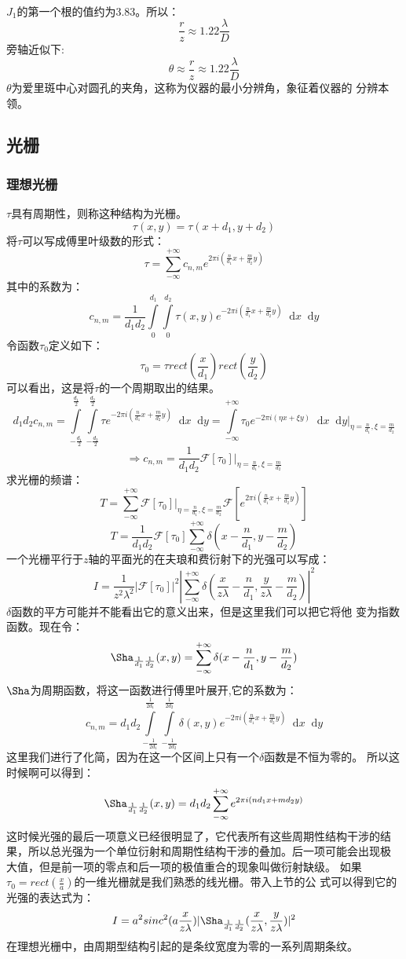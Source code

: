\documentclass{article}
\newcommand*{\dif}{\mathop{}\!\mathrm{d}}
\begin{document}
\paragraph{}
$J_1$的第一个根的值约为3.83。所以：
\[\frac{r}{z}\approx 1.22 \frac{\lambda}{D}\]
旁轴近似下:
\[\theta\approx \frac{r}{z}\approx 1.22 \frac{\lambda}{D}\]
$\theta$为爱里斑中心对圆孔的夹角，这称为仪器的最小分辨角，象征着仪器的
分辨本领。
\subsection{光栅}
\subsubsection{理想光栅}
$\tau$具有周期性，则称这种结构为光栅。
\[\tau(x,y)=\tau(x+d_1,y+d_2)\]
将$\tau$可以写成傅里叶级数的形式：
\[\tau=\sum_{-\infty}^{+\infty}c_{n,m}e^{2\pi
    i(\frac{n}{d_1}x+\frac{m}{d_2}y)}\]
其中的系数为：
\[c_{n,m}=\frac{1}{d_1d_2}\int\limits_0^{d_1}\int\limits_0^{d_2}\tau(x,y)e^{-2\pi
    i(\frac{n}{d_1}x+\frac{m}{d_2}y)}\dif x\dif y\]
令函数$\tau_0$定义如下：
\[\tau_0=\tau rect(\frac{x}{d_1})rect(\frac{y}{d_2})\]
可以看出，这是将$\tau$的一个周期取出的结果。
\[d_1d_2c_{n,m}=\int\limits_{-\frac{d_1}{2}}^{\frac{d_1}{2}}\int\limits_{-\frac{d_2}{2}}^{\frac{d_2}{2}}\tau
  e^{-2\pi i(\frac{n}{d_1}x+\frac{m}{d_2}y)}\dif
  x\dif y=\int\limits_{-\infty}^{+\infty}\tau_0e^{-2\pi i(\eta x+\xi
    y)}\dif x\dif y|_{\eta=\frac{n}{d_1},\xi=\frac{m}{d_2}}\]
\[\Rightarrow
  c_{n,m}=\frac{1}{d_1d_2}\mathscr{F}[\tau_0]|_{\eta=\frac{n}{d_1},\xi=\frac{m}{d_2}}\]
求光栅的频谱：
\[T=\sum_{-\infty}^{+\infty}\mathscr{F}[\tau_0]|_{\eta=\frac{n}{d_1},\xi=\frac{m}{d_2}}\mathscr{F}[e^{2\pi
    i(\frac{n}{d_1}x+\frac{m}{d_2}y)}]\]
\begin{equation}
\label{eq:10}
T=\frac{1}{d_1d_2}\mathscr{F}[\tau_0]\sum_{-\infty}^{+\infty}\delta(x-\frac{n}{d_{1}},y-\frac{m}{d_2})
\end{equation}
一个光栅平行于$z$轴的平面光的在夫琅和费衍射下的光强可以写成：
\[I=\frac{1}{z^2\lambda^2}|\mathscr{F}[\tau_0]|^2|\sum_{-\infty}^{+\infty}\delta(\frac{x}{z\lambda}-\frac{n}{d_1},\frac{y}{z\lambda}-\frac{m}{d_2})|^2\]
$\delta$函数的平方可能并不能看出它的意义出来，但是这里我们可以把它将他
变为指数函数。现在令：
\[\Sha_{\frac{1}{d_1}\frac{1}{d_2}}(x,y)=\sum_{-\infty}^{+\infty}\delta(x-\frac{n}{d_1},y-\frac{m}{d_2})\]
$\Sha$为周期函数，将这一函数进行傅里叶展开,它的系数为：
\[c_{n,m}=d_1d_2
  \int\limits_{-\frac{1}{2d_1}}^{\frac{1}{2d_1}}\int\limits_{-\frac{1}{2d_2}}^{\frac{1}{2d_2}}\delta(x,y)e^{-2\pi
  i(\frac{n}{d_1}x+\frac{m}{d_2}y)}\dif
  x\dif y\]
这里我们进行了化简，因为在这一个区间上只有一个$\delta$函数是不恒为零的。
所以这时候啊可以得到：
\[\Sha_{\frac{1}{d_1}\frac{1}{d_2}}(x,y)=d_1d_2\sum_{-\infty}^{+\infty}e^{2\pi
    i(nd_1x+md_2y)}\]
这时候光强的最后一项意义已经很明显了，它代表所有这些周期性结构干涉的结
果，所以总光强为一个单位衍射和周期性结构干涉的叠加。后一项可能会出现极
大值，但是前一项的零点和后一项的极值重合的现象叫做衍射缺级。
如果$\tau_0=rect(\frac{x}{a})$的一维光栅就是我们熟悉的线光栅。带入上节的公
式可以得到它的光强的表达式为：
\[I=a^2sinc^2(a
  \frac{x}{z\lambda})|\Sha_{\frac{1}{d_1}\frac{1}{d_2}}(\frac{x}{z\lambda},\frac{y}{z\lambda})|^2\]
在理想光栅中，由周期型结构引起的是条纹宽度为零的一系列周期条纹。
\end{document}
